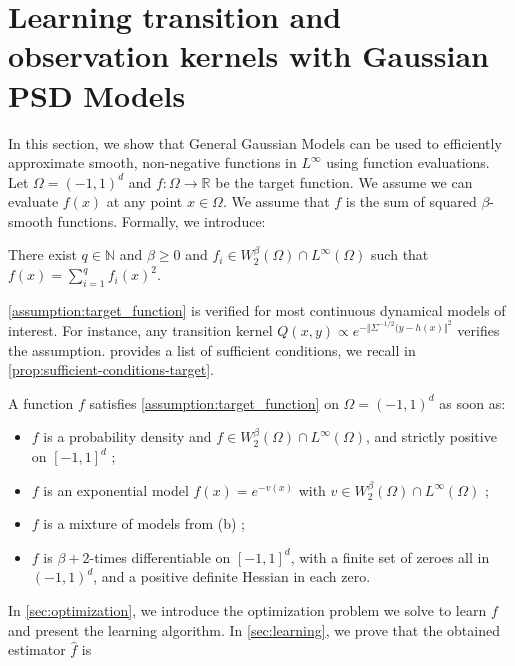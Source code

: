 \section{Learning transition and observation kernels with Gaussian PSD Models}\label{sec:learning-gaussian-psd}
In this section, we show that General Gaussian Models can be used to efficiently approximate smooth, non-negative functions in $L^\infty$ using function evaluations. Let $\Omega = (-1, 1)^d$ and $f: \Omega \to \mathbb R$ be the target function. We assume we can evaluate $f(x)$ at any point $x\in\Omega$. We assume that $f$ is the sum of squared $\beta$-smooth functions. Formally, we introduce:

\begin{assumption}\label{assumption:target_function}
    There exist $q \in\mathbb N$ and $\beta \geq 0$ and $f_i \in W^\beta_2(\Omega) \cap L^\infty(\Omega)$ such that $f(x) = \sum_{i=1}^q f_i(x)^2$.
\end{assumption}

\cref{assumption:target_function} is verified for most continuous dynamical models of interest. For instance, any transition kernel $Q(x, y) \propto e^{-\Vert \Sigma^{-1/2}(y - h(x)\Vert^2}$ verifies the assumption. \cite{ciliberto2021} provides a list of sufficient conditions, we recall in \cref{prop:sufficient-conditions-target}.

\begin{proposition}\label{prop:sufficient-conditions-target}
A function $f$ satisfies \cref{assumption:target_function} on $\Omega = (-1, 1)^d$ as soon as:
\begin{itemize}
    \item $f$ is a probability density and $f\in W_2^\beta(\Omega)\cap L^\infty(\Omega)$, and strictly positive on $[-1, 1]^d$ ;
    \item $f$ is an exponential model $f(x) = e^{-v(x)}$ with $v\in W_2^\beta(\Omega) \cap L^\infty(\Omega)$ ;
    \item $f$ is a mixture of models from (b) ;
    \item $f$ is $\beta+2$-times differentiable on $[-1, 1]^d$, with a finite set of zeroes all in $(-1, 1)^d$, and a positive definite Hessian in each zero.
\end{itemize}
\end{proposition}
%
In \cref{sec:optimization}, we introduce the optimization problem we solve to learn $f$ and present the learning algorithm. In \cref{sec:learning}, we prove that the obtained estimator $\hat f$ is

